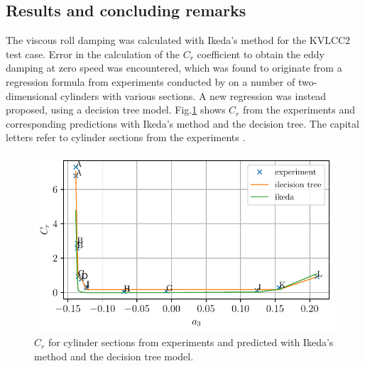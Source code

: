 \subsection*{Results and concluding remarks}
The viscous roll damping was calculated with Ikeda's method \cite{ikedaComponentsRollDamping1978} for the KVLCC2 test case. Error in the calculation of the $C_r$ coefficient to obtain the eddy damping at zero speed was encountered, which was found to originate from a regression formula from experiments conducted by \textcite{ikedaEddyMakingComponent1978} on a number of two-dimensional cylinders with various sections. A new regression was instead proposed, using a decision tree model.
Fig.\ref{fig:ikeda_sections} shows $C_r$ from the experiments and corresponding predictions with Ikeda's method and the decision tree. The capital letters refer to cylinder sections from the experiments
\cite{ikedaEddyMakingComponent1978}.
\begin{figure}[h]
\center
\includegraphics[width=\textwidth]{figures/ikeda_sections.pdf}
\vspace{-0.4cm}
\caption{$C_r$ for cylinder sections from experiments and predicted with Ikeda's method and the decision tree model.}
\label{fig:ikeda_sections}
\end{figure}
\FloatBarrier


